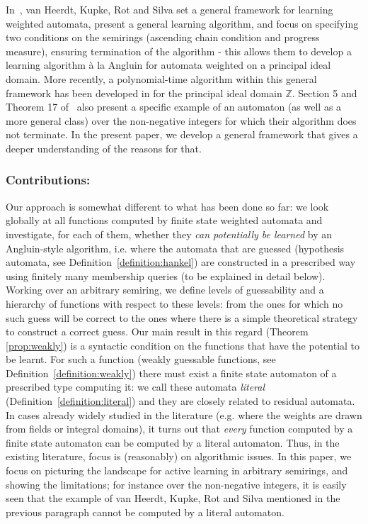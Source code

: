 \documentclass{lmcs}
\numberwithin{theorem}{section}
\begin{document}
In~\cite{HKRS20}, van Heerdt, Kupke, Rot and Silva set a general framework for learning weighted automata, present a general learning algorithm, and focus on specifying two conditions on the semirings (ascending chain condition and progress measure), ensuring termination of the algorithm - this allows them to develop a learning algorithm \`a la Angluin for automata weighted on a principal ideal domain. More recently, a polynomial-time algorithm within this general framework has been developed in \cite{BCSW24} for the principal ideal domain $\mathbb{Z}$. Section 5 and Theorem 17 of~\cite{HKRS20} also present a specific example of an automaton (as well as a more general class) over the non-negative integers for which their algorithm does not terminate. In the present paper, we develop a general framework that gives a deeper understanding of the reasons for that. 

\subsubsection*{\textbf{Contributions:}} Our approach is somewhat different to what has been done so far: we look globally at all functions computed by finite state weighted automata and investigate, for each of them, whether they \emph{can potentially be learned} by an Angluin-style algorithm, i.e. where the automata that are guessed (hypothesis automata, see Definition~\ref{definition:hankel}) are constructed in a prescribed way using finitely many membership queries (to be explained in detail below). Working over an arbitrary semiring, we define levels of guessability and a hierarchy of functions with respect to these levels: from the ones for which no such guess will be correct to the ones where there is a simple theoretical strategy to construct a correct guess. Our main result in this regard (Theorem \ref{prop:weakly}) is a syntactic condition on the functions that have the potential to be learnt. For such a function (weakly guessable functions, see Definition~\ref{definition:weakly}) there must exist a finite state automaton of a prescribed type computing it: we call these automata \emph{literal} (Definition~\ref{definition:literal}) and they are closely related to residual automata.  In cases already widely studied in the literature (e.g. where the weights are drawn from fields or integral domains), it turns out that \emph{every} function computed by a finite state automaton can be computed by a literal automaton. Thus, in the existing literature, focus is (reasonably) on algorithmic issues. In this paper, we focus on picturing the landscape for active learning in arbitrary semirings, and showing the limitations; for instance over the non-negative integers,  it is easily seen that the example of van Heerdt, Kupke, Rot and Silva mentioned in the previous paragraph cannot be computed by a literal automaton. 
\end{document}
